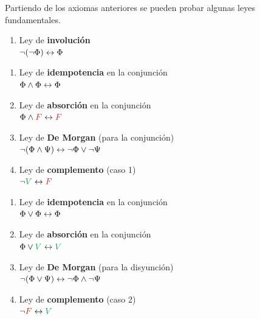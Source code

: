 Partiendo de los axiomas anteriores se pueden probar algunas leyes
fundamentales.

{\noindent\raggedleft
\begin{minipage}{1\textwidth}
    \begin{enumerate}[label=\arabic*a, start=6]
        \item Ley de \textbf{involución}\\
            $\lnot (\lnot \Phi) \leftrightarrow \Phi$
    \end{enumerate}
\end{minipage}
}

{\noindent\raggedleft
\begin{minipage}{0.45\textwidth}
    \begin{enumerate}[label=\arabic*a, start=7]
        \item Ley de \textbf{idempotencia} en la conjunción\\
            $\Phi \land \Phi \leftrightarrow \Phi$
        \item Ley de \textbf{absorción} en la conjunción\\
            $\Phi \land \lfalse \liff \lfalse$
        \item Ley de \textbf{De Morgan} (para la conjunción)\\
            $\lnot (\Phi \land \Psi) \leftrightarrow \lnot \Phi \lor \lnot \Psi$
        \item Ley de \textbf{complemento} (caso 1)\\
            $\lnot \ltrue \liff \lfalse$
    \end{enumerate}
\end{minipage}
\begin{minipage}{0.45\textwidth}
    \begin{enumerate}[label=\arabic*a, start=7]
        \item Ley de \textbf{idempotencia} en la conjunción\\
            $\Phi \lor \Phi \leftrightarrow \Phi$
        \item Ley de \textbf{absorción} en la conjunción\\
            $\Phi \lor \ltrue \liff \ltrue$
        \item Ley de \textbf{De Morgan} (para la disyunción)\\
            $\lnot (\Phi \lor \Psi) \leftrightarrow \lnot \Phi \land \lnot \Psi$
        \item Ley de \textbf{complemento} (caso 2)\\
            $\lnot \lfalse \liff \ltrue$
    \end{enumerate}
\end{minipage}
}

